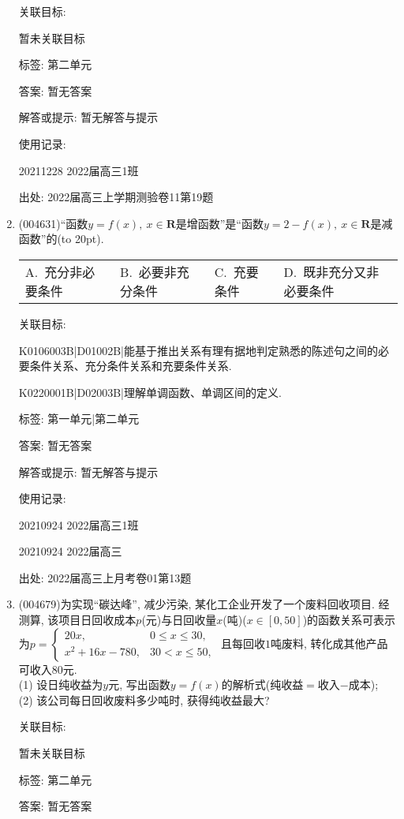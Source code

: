 \documentclass[10pt,a4paper]{article}
\newcommand{\bracket}[1]{(\hbox to #1pt{})}
\newcommand{\fourch}[4]{\par\begin{tabular}{p{.23\textwidth}p{.23\textwidth}p{.23\textwidth}p{.23\textwidth}}
A.~#1 &B.~#2& C.~#3& D.~#4
\end{tabular}}
\begin{document}
\begin{enumerate}[1.]
关联目标:

暂未关联目标



标签: 第二单元

答案: 暂无答案

解答或提示: 暂无解答与提示

使用记录:

20211228	2022届高三1班		


出处: 2022届高三上学期测验卷11第19题
\item { (004631)}``函数$y=f(x), \ x\in \mathbf{R}$是增函数''是``函数$y=2-f(x), \ x\in \mathbf{R}$是减函数''的\bracket{20}.
\fourch{充分非必要条件}{必要非充分条件}{充要条件}{既非充分又非必要条件}


关联目标:

K0106003B|D01002B|能基于推出关系有理有据地判定熟悉的陈述句之间的必要条件关系、充分条件关系和充要条件关系.

K0220001B|D02003B|理解单调函数、单调区间的定义.



标签: 第一单元|第二单元

答案: 暂无答案

解答或提示: 暂无解答与提示

使用记录:

20210924	2022届高三1班	

20210924	2022届高三	


出处: 2022届高三上月考卷01第13题
\item { (004679)}为实现``碳达峰'', 减少污染, 某化工企业开发了一个废料回收项目. 经测算, 该项目日回收成本$p$(元)与日回收量$x$(吨)($x\in [0,50]$)的函数关系可表示为$p=\begin{cases}20x, & 0\le x\le 30,  \\ x^2+16x-780, & 30<x \le 50,  \end{cases}$ 且每回收$1$吨废料, 转化成其他产品可收入$80$元.\\
(1) 设日纯收益为$y$元, 写出函数$y=f(x)$的解析式(纯收益$=$收入$-$成本);\\
(2) 该公司每日回收废料多少吨时, 获得纯收益最大?


关联目标:

暂未关联目标



标签: 第二单元

答案: 暂无答案


\end{enumerate}
\end{document}
